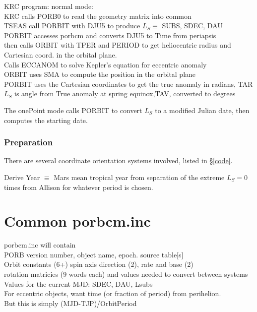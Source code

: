 \documentclass[draft]{article}
\newcommand{\qi}{\\ \hspace*{2.em}}      %
\newcommand{\qii}{\\ \hspace*{4.em}}     %
\newcommand{\qiii}{\\ \hspace*{6.em}}    %
\begin{document}
KRC program: normal mode:
\\ KRC calls PORB0 to read the geometry matrix into common
\\ TSEAS call PORBIT with DJU5 to produce $L_S \equiv $ SUBS, SDEC, DAU
\qi PORBIT accesses porbcm and converts DJU5 to Time from periapsis  
\qii then calls ORBIT with TPER and PERIOD to get heliocentric radius and Cartesian coord. in the orbital plane. 
\qiii Calls ECCANOM to solve Kepler's equation for eccentric anomaly
\qii  ORBIT uses SMA to compute the position in the orbital plane
\qi PORBIT uses the Cartesian coordinates to get the true anomaly in radians, TAR
\qii $L_S$ is angle from True anomaly at spring equinox,TAV, converted to degrees

The onePoint mode calls PORBIT to convert $L_S$ to a modified Julian date, then computes the starting date.

\subsubsection{Preparation }
There are several coordinate orientation systems involved, listed in \S \ref{code}. 

Derive Year $\equiv$ Mars mean tropical year from
separation of the extreme $L_S=0$ times from Allison for whatever period is
chosen.

\section{Common porbcm.inc \label{pcom}}  %

porbcm.inc will contain
\qi PORB version number, object name, epoch. source table[s]
\qi Orbit constants (6+) spin axis direction (2), rate and base (2)
\qi rotation matricies (9 words each) and values needed to convert between systems
\qi Values for the current MJD: SDEC, DAU, Lsubs
\qi For eccentric objects, want time (or fraction of period) from perihelion.
\qii But this is simply (MJD-TJP)/OrbitPeriod
\end{document}
